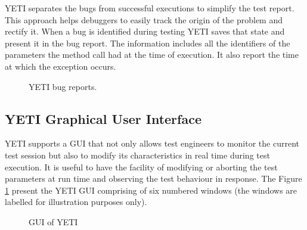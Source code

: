 YETI separates the bugs from successful executions to simplify the test report. This approach helps debuggers to easily track the origin of the problem and rectify it. When a bug is identified during testing YETI saves that state and present it in the bug report. The information includes all the identifiers of the parameters the method call had at the time of execution. It also report the time at which the exception occurs.

\begin{figure}[h]
	\centering
	\caption{YETI bug reports.}
\end{figure}

\subsection{YETI Graphical User Interface}
YETI supports a GUI that not only allows test engineers to monitor the current test session but also to modify its characteristics in real time during test execution. It is useful to have the facility of modifying or aborting the test parameters at run time and observing the test behaviour in response. The Figure \ref{fig:yetiGUI} present the YETI GUI comprising of six numbered windows (the windows are labelled for illustration purposes only).

\begin{figure}[h]
	\centering
	\label{fig:yetiGUI}
	\caption{GUI of YETI}
\end{figure}

